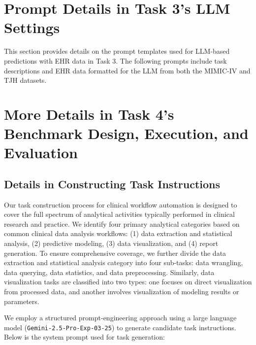 \documentclass{article}
\begin{document}
\section{Prompt Details in Task 3's LLM Settings}
\label{sec:app_prompt_details_task3}

This section provides details on the prompt templates used for LLM-based predictions with EHR data in Task 3. The following prompts include task descriptions and EHR data formatted for the LLM from both the MIMIC-IV and TJH datasets.











\section{More Details in Task 4's Benchmark Design, Execution, and Evaluation}
\label{sec:app_task4_benchmark_design_execution_eval}

\subsection{Details in Constructing Task Instructions}
\label{sec:app_task4_constructing_tasks_details}

Our task construction process for clinical workflow automation is designed to cover the full spectrum of analytical activities typically performed in clinical research and practice. We identify four primary analytical categories based on common clinical data analysis workflows: (1) data extraction and statistical analysis, (2) predictive modeling, (3) data visualization, and (4) report generation.
To ensure comprehensive coverage, we further divide the data extraction and statistical analysis category into four sub-tasks: data wrangling, data querying, data statistics, and data preprocessing. Similarly, data visualization tasks are classified into two types: one focuses on direct visualization from processed data, and another involves visualization of modeling results or parameters.

We employ a structured prompt-engineering approach using a large language model (\texttt{Gemini-2.5-Pro-Exp-03-25}) to generate candidate task instructions. Below is the system prompt used for task generation:
\end{document}

